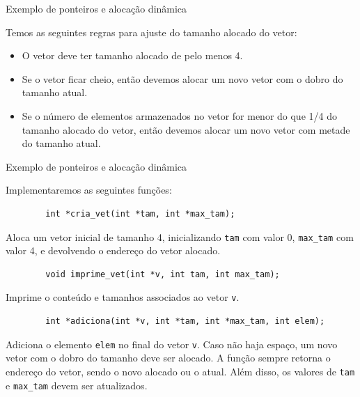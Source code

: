 \documentclass[handout]{beamer}
\newcommand{\cod}[1]{\texttt{#1}}
\begin{document}
\begin{frame}[fragile]{Exemplo de ponteiros e alocação dinâmica}

    Temos as seguintes regras para ajuste do tamanho alocado do vetor:
    \begin{itemize}
        \item O vetor deve ter tamanho alocado de pelo menos 4.
        \item Se o vetor ficar cheio, então devemos alocar um novo vetor com o dobro do tamanho atual.
        \item Se o número de elementos armazenados no vetor for menor do que 1/4 do tamanho alocado do vetor, então devemos alocar um novo vetor com metade do tamanho atual.
    \end{itemize}

\end{frame}

\begin{frame}[fragile]{Exemplo de ponteiros e alocação dinâmica}

    \small
    Implementaremos as seguintes funções:
    \vspace{-0.3cm}

    \begin{verbatim}
        int *cria_vet(int *tam, int *max_tam);
    \end{verbatim}
    \vspace{-0.3cm}
    Aloca um vetor inicial de tamanho 4, inicializando \cod{tam} com valor 0, \texttt{max_tam} com valor 4, e devolvendo o endereço do vetor alocado.
    \vspace{-0.3cm}

    \pause
    \begin{verbatim}
        void imprime_vet(int *v, int tam, int max_tam);
    \end{verbatim}
    \vspace{-0.3cm}
    Imprime o conteúdo e tamanhos associados ao vetor \cod{v}.
    \vspace{-0.3cm}

    \pause
    \begin{verbatim}
        int *adiciona(int *v, int *tam, int *max_tam, int elem);
    \end{verbatim}
    \vspace{-0.3cm}
    Adiciona o elemento \cod{elem} no final do vetor \cod{v}.
    Caso não haja espaço, um novo vetor com o dobro do tamanho deve ser alocado.
    A função sempre retorna o endereço do vetor, sendo o novo alocado ou o atual.
    Além disso, os valores de \cod{tam} e \texttt{max_tam} devem ser atualizados.

\end{frame}
\end{document}
